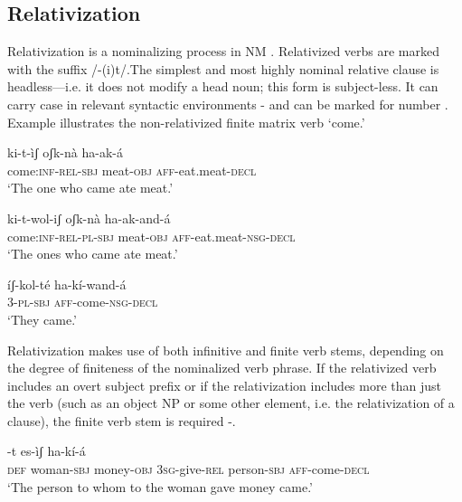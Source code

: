 \documentclass[output=paper]{langsci/langscibook}
\begin{document}
\subsection{Relativization}\label{sec:mahland:2.2}

Relativization is a nominalizing process in NM \citep[225]{AhlandM2012}. Relativized verbs are marked with the suffix /-(i)t/.The simplest and most highly nominal relative clause is headless—i.e. it does not modify a head noun; this form is subject-less. It can carry case in relevant syntactic environments - and can be marked for number . Example  illustrates the non-relativized finite matrix verb `come.' 

\ea\label{ex:mahland:40}
\gll ki-t-ìʃ                    oʃk-nà      ha-ak-á  \\
come:\textsc{inf-rel-sbj}   meat-\textsc{obj}   \textsc{aff}-eat.meat-\textsc{decl}\\
\glt `The one who came ate meat.'
\z

\ea\label{ex:mahland:41}
\gll ki-t-wol-iʃ           oʃk-nà       ha-ak-and-á\\
come:\textsc{inf-rel-pl-sbj}   meat-\textsc{obj}   \textsc{aff}-eat.meat-\textsc{nsg-decl} \\
\glt `The ones who came ate meat.' 
\z

\ea\label{ex:mahland:42}
\gll íʃ-kol-té    ha-kí-wand-á \\
\textsc{3-pl-sbj} \textsc{aff}{}-come-\textsc{nsg-decl} \\
\glt `They came.'
\z

Relativization makes use of both infinitive and finite verb stems, depending on the degree of finiteness of the nominalized verb phrase. If the relativized verb includes an overt subject prefix or if the relativization includes more than just the verb (such as an object NP or some other element, i.e. the relativization of a clause), the finite verb stem is required -. 


\ea\label{ex:mahland:43}
-t  es-ìʃ           ha-kí-{\downstep}á\\
 {\db}\textsc{def}     woman\textsc{{}-sbj}   money\textsc{{}-obj}   \textsc{3sg}{}-give\textsc{{}-rel}  person\textsc{{}-sbj}   \textsc{aff}{}-come-\textsc{decl} \\
\glt `The person to whom to the woman gave money came.'
\z
\end{document}
